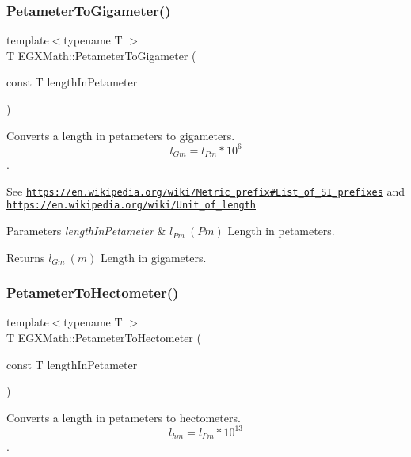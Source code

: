 \subsubsection{\texorpdfstring{Petameter\+To\+Gigameter()}{PetameterToGigameter()}}
{\footnotesize\ttfamily template$<$typename T $>$ \\
T E\+G\+X\+Math\+::\+Petameter\+To\+Gigameter (\begin{DoxyParamCaption}\item[{const T}]{length\+In\+Petameter }\end{DoxyParamCaption})}



Converts a length in petameters to gigameters. \[ l_{Gm}=l_{Pm} * 10^{6} \]. 

See \href{https://en.wikipedia.org/wiki/Metric_prefix#List_of_SI_prefixes}{\tt https\+://en.\+wikipedia.\+org/wiki/\+Metric\+\_\+prefix\#\+List\+\_\+of\+\_\+\+S\+I\+\_\+prefixes} and \href{https://en.wikipedia.org/wiki/Unit_of_length}{\tt https\+://en.\+wikipedia.\+org/wiki/\+Unit\+\_\+of\+\_\+length} 
\begin{DoxyParams}{Parameters}
{\em length\+In\+Petameter} & $ l_{Pm}\ (Pm)$ Length in petameters. \\
\hline
\end{DoxyParams}
\begin{DoxyReturn}{Returns}
$ l_{Gm}\ (m)$ Length in gigameters. 
\end{DoxyReturn}
\mbox{\label{group___e_g_x_math-_conversions-_length_conversions-_s_i-_petameter-_s_i_ga18de0d328d6200590dd25a522ad1aeb4}} 
\subsubsection{\texorpdfstring{Petameter\+To\+Hectometer()}{PetameterToHectometer()}}
{\footnotesize\ttfamily template$<$typename T $>$ \\
T E\+G\+X\+Math\+::\+Petameter\+To\+Hectometer (\begin{DoxyParamCaption}\item[{const T}]{length\+In\+Petameter }\end{DoxyParamCaption})}



Converts a length in petameters to hectometers. \[ l_{hm}=l_{Pm} * 10^{13} \]. 

